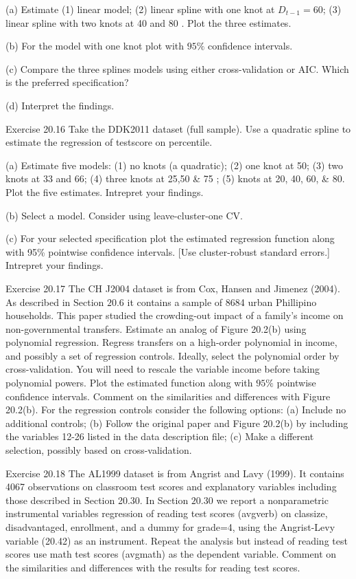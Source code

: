 \documentclass[10pt]{article}
\begin{document}
(a) Estimate (1) linear model; (2) linear spline with one knot at $D_{t-1}=60$; (3) linear spline with two knots at 40 and 80 . Plot the three estimates.

(b) For the model with one knot plot with $95 \%$ confidence intervals.

(c) Compare the three splines models using either cross-validation or AIC. Which is the preferred specification?

(d) Interpret the findings.

Exercise 20.16 Take the DDK2011 dataset (full sample). Use a quadratic spline to estimate the regression of testscore on percentile.

(a) Estimate five models: (1) no knots (a quadratic); (2) one knot at 50; (3) two knots at 33 and 66; (4) three knots at 25,50 \& 75 ; (5) knots at 20, 40, 60, \& 80. Plot the five estimates. Intrepret your findings.

(b) Select a model. Consider using leave-cluster-one CV.

(c) For your selected specification plot the estimated regression function along with 95\% pointwise confidence intervals. [Use cluster-robust standard errors.] Intrepret your findings.

Exercise 20.17 The CH J2004 dataset is from Cox, Hansen and Jimenez (2004). As described in Section $20.6$ it contains a sample of 8684 urban Phillipino households. This paper studied the crowding-out impact of a family's income on non-governmental transfers. Estimate an analog of Figure 20.2(b) using polynomial regression. Regress transfers on a high-order polynomial in income, and possibly a set of regression controls. Ideally, select the polynomial order by cross-validation. You will need to rescale the variable income before taking polynomial powers. Plot the estimated function along with $95 \%$ pointwise confidence intervals. Comment on the similarities and differences with Figure 20.2(b). For the regression controls consider the following options: (a) Include no additional controls; (b) Follow the original paper and Figure 20.2(b) by including the variables 12-26 listed in the data description file; (c) Make a different selection, possibly based on cross-validation.

Exercise 20.18 The AL1999 dataset is from Angrist and Lavy (1999). It contains 4067 observations on classroom test scores and explanatory variables including those described in Section 20.30. In Section $20.30$ we report a nonparametric instrumental variables regression of reading test scores (avgverb) on classize, disadvantaged, enrollment, and a dummy for grade=4, using the Angrist-Levy variable (20.42) as an instrument. Repeat the analysis but instead of reading test scores use math test scores (avgmath) as the dependent variable. Comment on the similarities and differences with the results for reading test scores.
\end{document}
